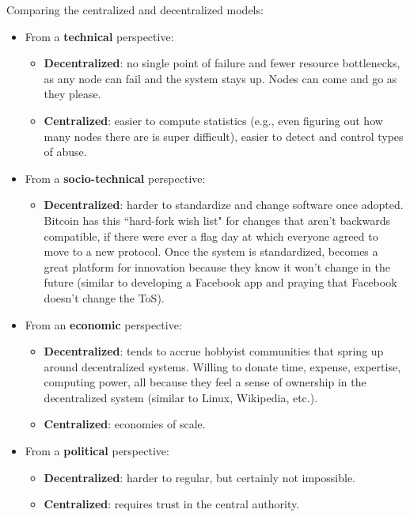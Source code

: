 \documentclass[12pt]{article}
\begin{document}
Comparing the centralized and decentralized models:
\begin{itemize}

\item From a \textbf{technical} perspective:
\begin{itemize}
\item \textbf{Decentralized}: no single point of failure and fewer resource bottlenecks, as any node can fail and the system stays up. Nodes can come and go as they please.
\item \textbf{Centralized}: easier to compute statistics (e.g., even figuring out how many nodes there are is super difficult), easier to detect and control types of abuse.
\end{itemize}

\item From a \textbf{socio-technical} perspective:
\begin{itemize}
\item \textbf{Decentralized}: harder to standardize and change software once adopted. Bitcoin has this ``hard-fork wish list" for changes that aren't backwards compatible, if there were ever a flag day at which everyone agreed to move to a new protocol. Once the system is standardized, becomes a great platform for innovation because they know it won't change in the future (similar to developing a Facebook app and praying that Facebook doesn't change the ToS).
\end{itemize}

\item From an \textbf{economic} perspective:
\begin{itemize}
\item \textbf{Decentralized}: tends to accrue hobbyist communities that spring up around decentralized systems. Willing to donate time, expense, expertise, computing power, all because they feel a sense of ownership in the decentralized system (similar to Linux, Wikipedia, etc.).
\item \textbf{Centralized}: economies of scale.
\end{itemize}

\item From a \textbf{political} perspective:
\begin{itemize}
\item \textbf{Decentralized}: harder to regular, but certainly not impossible.
\item \textbf{Centralized}: requires trust in the central authority.
\end{itemize}
\end{itemize}
\end{document}
